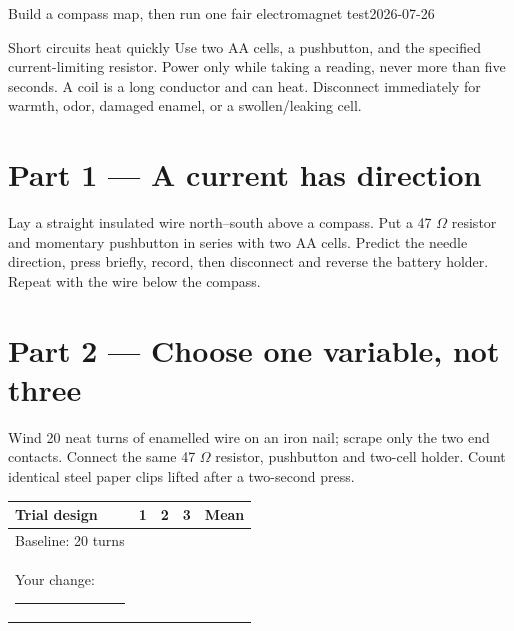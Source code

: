 

  {Build a compass map, then run one fair electromagnet test}{2026-07-26}


\begin{teloshazard}{Short circuits heat quickly}
Use two AA cells, a pushbutton, and the specified current-limiting resistor.
Power only while taking a reading, never more than five seconds. A coil is a
long conductor and can heat. Disconnect immediately for warmth, odor, damaged
enamel, or a swollen/leaking cell. \stopline
\end{teloshazard}

\section{Part 1 — A current has direction}
Lay a straight insulated wire north--south above a compass. Put a 47 \(\Omega\)
resistor and momentary pushbutton in series with two AA cells. Predict the
needle direction, press briefly, record, then disconnect and reverse the battery
holder. Repeat with the wire below the compass.

\begin{center}
\end{center}

\begin{labrecord}\end{labrecord}

\section{Part 2 — Choose one variable, not three}
Wind 20 neat turns of enamelled wire on an iron nail; scrape only the two end
contacts. Connect the same 47 \(\Omega\) resistor, pushbutton and two-cell holder.
Count identical steel paper clips lifted after a two-second press.

\begin{tabularx}{\linewidth}{@{}L C C C C@{}}
\toprule
\textbf{Trial design} & 1 & 2 & 3 & Mean\\ \midrule
Baseline: 20 turns &&&&\\
Your change: \rule{3cm}{.3pt} &&&&\\
\bottomrule
\end{tabularx}

